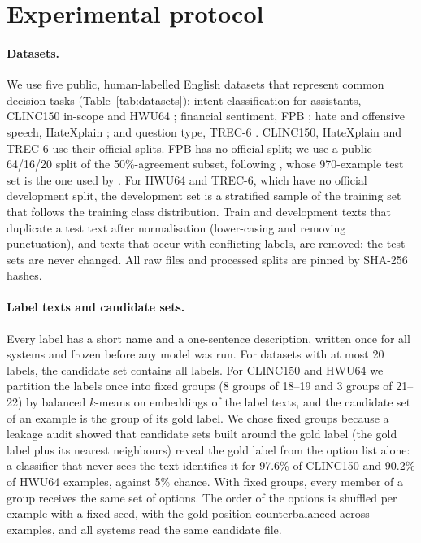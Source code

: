 \section{Experimental protocol}
\label{sec:protocol}

\paragraph{Datasets.}
We use five public, human-labelled English datasets that represent common decision tasks
(\hyperref[tab:datasets]{Table~\ref*{tab:datasets}}): intent classification for assistants, CLINC150 in-scope \citep{larson2019evaluation} and
HWU64 \citep{liu2019benchmarking}; financial sentiment, FPB \citep{malo2014good}; hate and offensive speech,
HateXplain \citep{mathew2021hatexplain}; and question type, TREC-6 \citep{li2002learning}. CLINC150, HateXplain and
TREC-6 use their official splits. FPB has no official split; we use a public 64/16/20 split of the 50\%-agreement subset,
following \citet{araci2019finbert}, whose 970-example test set is the one used by \citet{deusser2026jev}. For HWU64 and TREC-6, which have no official development
split, the development set is a stratified sample of the training set that follows the training class distribution.
Train and development texts that duplicate a test text after normalisation (lower-casing and removing punctuation),
and texts that occur with conflicting labels, are removed; the test sets are never changed. All raw files and processed
splits are pinned by SHA-256 hashes.

\begin{table}[t]
  \centering
  \caption{\textbf{The five datasets span intent, sentiment, moderation and question-type decisions with 3 to 150
  classes.} CLINC150 and HWU64 use fixed label groups as candidate sets ($K$ = 18--22 options); the other three use all
  labels. Train/dev/test sizes after cleaning.}
  \label{tab:datasets}
  \scriptsize
  
\end{table}

\paragraph{Label texts and candidate sets.}
Every label has a short name and a one-sentence description, written once for all systems and frozen before any model
was run. For datasets with at most 20 labels, the candidate set contains all labels. For CLINC150 and HWU64 we
partition the labels once into fixed groups (8 groups of 18--19 and 3 groups of 21--22) by balanced $k$-means on
embeddings of the label texts, and the candidate set of an example is the group of its gold label. We chose fixed groups
because a leakage audit showed that candidate sets built around the gold label (the gold label plus its nearest
neighbours) reveal the gold label from the option list alone: a classifier that never sees the text identifies it for
97.6\% of CLINC150 and 90.2\% of HWU64 examples, against 5\% chance. With fixed groups, every member of a group receives
the same set of options. The order of the options is shuffled per example with a fixed seed, with the gold position
counterbalanced across examples, and all systems read the same candidate file.

